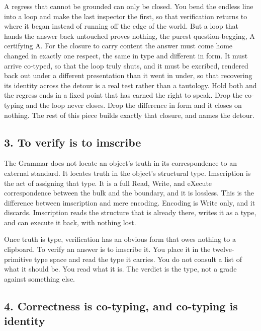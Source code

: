 A regress that cannot be grounded can only be closed. You bend the
endless line into a loop and make the last inspector the first, so that
verification returns to where it began instead of running off the edge
of the world. But a loop that hands the answer back untouched proves
nothing, the purest question-begging, A certifying A. For the closure to
carry content the answer must come home changed in exactly one respect,
the same in type and different in form. It must arrive co-typed, so that
the loop truly shuts, and it must be excribed, rendered back out under a
different presentation than it went in under, so that recovering its
identity across the detour is a real test rather than a tautology. Hold
both and the regress ends in a fixed point that has earned the right to
speak. Drop the co-typing and the loop never closes. Drop the difference
in form and it closes on nothing. The rest of this piece builds exactly
that closure, and names the detour.

\hypertarget{to-verify-is-to-imscribe-1}{%
\subsection{3. To verify is to
imscribe}\label{to-verify-is-to-imscribe-1}}

The Grammar does not locate an object's truth in its correspondence to
an external standard. It locates truth in the object's structural type.
Imscription is the act of assigning that type. It is a full Read, Write,
and eXecute correspondence between the bulk and the boundary, and it is
lossless. This is the difference between imscription and mere encoding.
Encoding is Write only, and it discards. Imscription reads the structure
that is already there, writes it as a type, and can execute it back,
with nothing lost.

Once truth is type, verification has an obvious form that owes nothing
to a clipboard. To verify an answer is to imscribe it. You place it in
the twelve-primitive type space and read the type it carries. You do not
consult a list of what it should be. You read what it is. The verdict is
the type, not a grade against something else.

\hypertarget{correctness-is-co-typing-and-co-typing-is-identity}{%
\subsection{4. Correctness is co-typing, and co-typing is
identity}\label{correctness-is-co-typing-and-co-typing-is-identity}}

